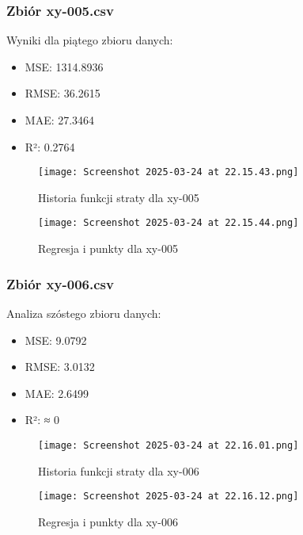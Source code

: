 \documentclass{article}
\begin{document}
\subsubsection{Zbiór xy-005.csv}
Wyniki dla piątego zbioru danych:
\begin{itemize}
    \item MSE: 1314.8936
    \item RMSE: 36.2615
    \item MAE: 27.3464
    \item R²: 0.2764
\end{itemize}

\begin{figure}[H]
    \centering
    \begin{minipage}{0.45\textwidth}
        \texttt{[image: Screenshot 2025-03-24 at 22.15.43.png]}
        \caption{Historia funkcji straty dla xy-005}
    \end{minipage}
    \hfill
    \begin{minipage}{0.45\textwidth}
        \texttt{[image: Screenshot 2025-03-24 at 22.15.44.png]}
        \caption{Regresja i punkty dla xy-005}
    \end{minipage}
\end{figure}

\subsubsection{Zbiór xy-006.csv}
Analiza szóstego zbioru danych:
\begin{itemize}
    \item MSE: 9.0792
    \item RMSE: 3.0132
    \item MAE: 2.6499
    \item R²: ≈ 0
\end{itemize}

\begin{figure}[H]
    \centering
    \begin{minipage}{0.45\textwidth}
        \texttt{[image: Screenshot 2025-03-24 at 22.16.01.png]}
        \caption{Historia funkcji straty dla xy-006}
    \end{minipage}
    \hfill
    \begin{minipage}{0.45\textwidth}
        \texttt{[image: Screenshot 2025-03-24 at 22.16.12.png]}
        \caption{Regresja i punkty dla xy-006}
    \end{minipage}
\end{figure}
\end{document}
